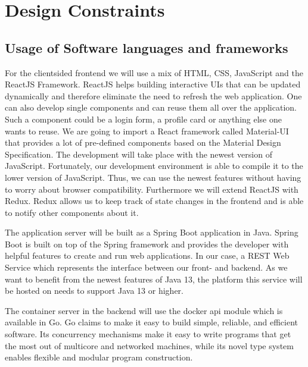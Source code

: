 \documentclass[a4paper,12pt,chapterprefix=false,bibliography=totoc,listof=totoc,]{scrreprt}
\begin{document}
\section{Design Constraints}

 
\subsection{{\color{magenta} Usage of Software languages and frameworks}}
{\color{magenta}
For the clientsided frontend we will use a mix of HTML, CSS, JavaScript and the ReactJS Framework. ReactJS helps building interactive UIs that can be updated dynamically and therefore eliminate the need to refresh the web application. One can also develop single components and can reuse them all over the application. Such a component could be a login form, a profile card or anything else one wants to reuse. We are going to import a React framework called Material-UI that provides a lot of pre-defined components based on the Material Design Specification. The development will take place with the newest version of JavaScript. Fortunately, our development environment is able to compile it to the lower version of JavaScript. Thus, we can use the newest features without having to worry about browser compatibility. Furthermore we will extend ReactJS with Redux. Redux allows us to keep track of state changes in the frontend and is able to notify other components about it.

The application server will be built as a Spring Boot application in Java. Spring Boot is built on top of the Spring framework and provides the developer with helpful features to create and run web applications. In our case, a REST Web Service which represents the interface between our front- and backend. As we want to benefit from the newest features of Java 13, the platform this service will be hosted on needs to support Java 13 or higher.

The container server in the backend will use the docker api module which is available in Go. Go claims to make it easy to build simple, reliable, and efficient software. Its concurrency mechanisms make it easy to write programs that get the most out of multicore and networked machines, while its novel type system enables flexible and modular program construction.
}
\end{document}

